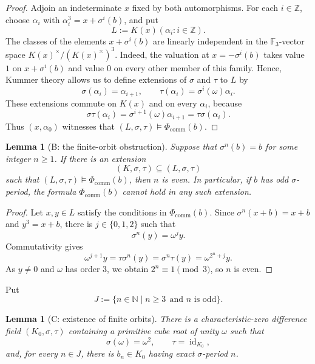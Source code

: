 \documentclass[10pt,a4paper]{amsart}
\renewcommand{\ge}{\geqslant}
\newtheorem{lemma}[theorem]{Lemma}
\theoremstyle{definition}
\newcommand{\Z}{\mathbb Z}
\newcommand{\N}{\mathbb N}
\DeclareMathOperator{\id}{id}
\begin{document}
\begin{proof}
Adjoin an indeterminate $x$ fixed by both automorphisms.
For each $i\in\Z$, choose $\alpha_i$ with
$\alpha_i^3=x+\sigma^i(b)$, and put
\[
L:=K(x)(\alpha_i:i\in\Z).
\]
The classes of the elements $x+\sigma^i(b)$ are linearly
independent in the $\mathbb F_3$-vector space
$K(x)^\times/(K(x)^\times)^3$. Indeed, the valuation at $x=-\sigma^i(b)$ takes value $1$
on $x+\sigma^i(b)$ and value $0$ on every other member
of this family. Hence, Kummer theory allows us to define extensions of $\sigma$ and $\tau$ to $L$ by
\[
  \sigma(\alpha_i)=\alpha_{i+1},
  \qquad
  \tau(\alpha_i)=\sigma^i(\omega)\alpha_i.
\]
These extensions commute on $K(x)$ and on every $\alpha_i$, because
\[
  \sigma\tau(\alpha_i)
  =\sigma^{i+1}(\omega)\alpha_{i+1}
  =\tau\sigma(\alpha_i).
\]
Thus $(x,\alpha_0)$ witnesses that $(L,\sigma,\tau)\models\Phi_{\mathrm{comm}}(b)$.
\end{proof}
\begin{lemma}[B: the finite-orbit obstruction]
\label{comm:lem:period}
Suppose that $\sigma^n(b)=b$ for some integer $n\ge1$.
If there is an extension
\[
  (K,\sigma,\tau)\subseteq(L,\sigma,\tau)
\]
such that $(L,\sigma,\tau)\models\Phi_{\mathrm{comm}}(b)$,
then $n$ is even. In particular, if $b$ has odd
$\sigma$-period, the formula $\Phi_{\mathrm{comm}}(b)$
cannot hold in any such extension.
\end{lemma}

\begin{proof}
Let $x,y\in L$ satisfy the conditions in
$\Phi_{\mathrm{comm}}(b)$. Since
$\sigma^n(x+b)=x+b$ and $y^3=x+b$, there is
$j\in\{0,1,2\}$ such that
\[
  \sigma^n(y)=\omega^j y.
\]
Commutativity gives
\[
  \omega^{j+1}y
  =\tau\sigma^n(y)
  =\sigma^n\tau(y)
  =\omega^{2^n+j}y.
\]
As $y\ne0$ and $\omega$ has order $3$, we obtain
$2^n\equiv1\pmod3$, so $n$ is even.
\end{proof}
Put
\[
J:=\{n\in\N\mid n\ge3\ \ \text{and $n$ is odd}\}.
\]

\begin{lemma}[C: existence of finite orbits]
\label{comm:lem:exist}
There is a characteristic-zero difference field
$(K_0,\sigma,\tau)$ containing a primitive cube
root of unity $\omega$ such that
\[
\sigma(\omega)=\omega^2,\qquad \tau=\id_{K_0},
\]
and, for every $n\in J$, there is $b_n\in K_0$ having exact
$\sigma$-period $n$.
\end{lemma}
\end{document}
